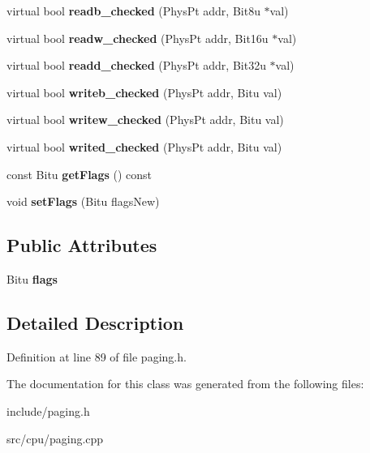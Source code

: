 \begin{DoxyCompactItemize}
\item 
\hypertarget{classPageHandler_ae3dcf8d33fef258d08637cb0baf51a3d}{virtual bool {\bfseries readb\-\_\-checked} (Phys\-Pt addr, Bit8u $\ast$val)}\label{classPageHandler_ae3dcf8d33fef258d08637cb0baf51a3d}

\item 
\hypertarget{classPageHandler_a69bd6b5dd4e6c86211129df23045711a}{virtual bool {\bfseries readw\-\_\-checked} (Phys\-Pt addr, Bit16u $\ast$val)}\label{classPageHandler_a69bd6b5dd4e6c86211129df23045711a}

\item 
\hypertarget{classPageHandler_a8f2c1c323c5159348031ae6d7ca11718}{virtual bool {\bfseries readd\-\_\-checked} (Phys\-Pt addr, Bit32u $\ast$val)}\label{classPageHandler_a8f2c1c323c5159348031ae6d7ca11718}

\item 
\hypertarget{classPageHandler_a2e43caf55e0f752d080ef1e723533e8e}{virtual bool {\bfseries writeb\-\_\-checked} (Phys\-Pt addr, Bitu val)}\label{classPageHandler_a2e43caf55e0f752d080ef1e723533e8e}

\item 
\hypertarget{classPageHandler_a62c89d9498bbaa9e962d02f3ebdbbf64}{virtual bool {\bfseries writew\-\_\-checked} (Phys\-Pt addr, Bitu val)}\label{classPageHandler_a62c89d9498bbaa9e962d02f3ebdbbf64}

\item 
\hypertarget{classPageHandler_aab88a929a0647d9923ab75aaf62ce633}{virtual bool {\bfseries writed\-\_\-checked} (Phys\-Pt addr, Bitu val)}\label{classPageHandler_aab88a929a0647d9923ab75aaf62ce633}

\item 
\hypertarget{classPageHandler_a352d52997241c574d4ef7f12d842f697}{const Bitu {\bfseries get\-Flags} () const }\label{classPageHandler_a352d52997241c574d4ef7f12d842f697}

\item 
\hypertarget{classPageHandler_a14611a8cfa950d5305d074252189139a}{void {\bfseries set\-Flags} (Bitu flags\-New)}\label{classPageHandler_a14611a8cfa950d5305d074252189139a}

\end{DoxyCompactItemize}
\subsection*{Public Attributes}
\begin{DoxyCompactItemize}
\item 
\hypertarget{classPageHandler_afdba8b3717029016c4b530339a2440d3}{Bitu {\bfseries flags}}\label{classPageHandler_afdba8b3717029016c4b530339a2440d3}

\end{DoxyCompactItemize}


\subsection{Detailed Description}


Definition at line 89 of file paging.\-h.



The documentation for this class was generated from the following files\-:\begin{DoxyCompactItemize}
\item 
include/paging.\-h\item 
src/cpu/paging.\-cpp\end{DoxyCompactItemize}
